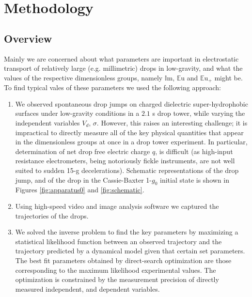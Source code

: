 \documentclass[12pt,a4paper,oneside]{book}
\begin{document}
\chapter{Methodology}
\section{Overview}
Mainly we are concerned about what parameters are important in electrostatic transport of relatively large (e.g. millimetric) drops in low-gravity, and what the values of the respective dimensionless groups, namely $\mathbb{I}\mbox{m}$, $\mathbb{E}\mbox{u}$ and ${\mathbb{E}\mbox{u}}_+$ might be. To find typical vales of these parameters we used the following approach:
\begin{enumerate}
\item We observed spontaneous drop jumps on charged dielectric super-hydrophobic surfaces under low-gravity conditions in a $2.1$ s drop tower, while varying the independent variables $V_d$, $\sigma$. However, this raises an interesting challenge; it is impractical to directly measure all of the key physical quantities that appear in the dimensionless groups at once in a drop tower experiment. In particular, determination of net drop free electric charge $q$, is difficult (as high-input resistance electrometers, being notoriously fickle instruments, are not well suited to sudden 15-g decelerations). Schematic representations of the drop jump, and of the drop in the Cassie-Baxter 1-$g_0$ initial state is shown in Figures \ref{fig:apparatus0} and \ref{fig:schematic}.
\item Using high-speed video and image analysis software we captured the trajectories of the drops. 
\item We solved the inverse problem to find the key parameters by maximizing a statistical likelihood function between an observed trajectory and the trajectory predicted by a dynamical model given that certain set parameters. The best fit parameters obtained by direct-search optimization are those corresponding to the maximum likelihood experimental values. The optimization is constrained by the measurement precision of directly measured independent, and dependent variables.
\end{enumerate}
\end{document}
